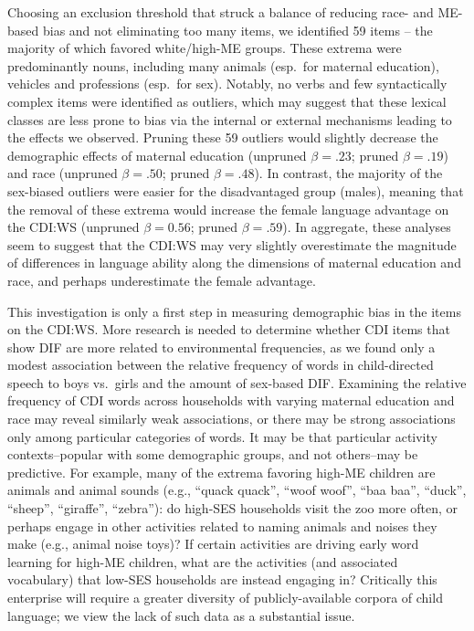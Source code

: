 \documentclass[10pt, letterpaper]{article}
\begin{document}
Choosing an exclusion threshold that struck a balance of reducing race-
and ME-based bias and not eliminating too many items, we identified 59
items -- the majority of which favored white/high-ME groups. These
extrema were predominantly nouns, including many animals (esp.~for
maternal education), vehicles and professions (esp.~for sex). Notably,
no verbs and few syntactically complex items were identified as
outliers, which may suggest that these lexical classes are less prone to
bias via the internal or external mechanisms leading to the effects we
observed. Pruning these 59 outliers would slightly decrease the
demographic effects of maternal education (unpruned \(\beta=.23\);
pruned \(\beta=.19\)) and race (unpruned \(\beta=.50\); pruned
\(\beta=.48\)). In contrast, the majority of the sex-biased outliers
were easier for the disadvantaged group (males), meaning that the
removal of these extrema would increase the female language advantage on
the CDI:WS (unpruned \(\beta=0.56\); pruned \(\beta=.59\)). In
aggregate, these analyses seem to suggest that the CDI:WS may very
slightly overestimate the magnitude of differences in language ability
along the dimensions of maternal education and race, and perhaps
underestimate the female advantage.

This investigation is only a first step in measuring demographic bias in
the items on the CDI:WS. More research is needed to determine whether
CDI items that show DIF are more related to environmental frequencies,
as we found only a modest association between the relative frequency of
words in child-directed speech to boys vs.~girls and the amount of
sex-based DIF. Examining the relative frequency of CDI words across
households with varying maternal education and race may reveal similarly
weak associations, or there may be strong associations only among
particular categories of words. It may be that particular activity
contexts--popular with some demographic groups, and not others--may be
predictive. For example, many of the extrema favoring high-ME children
are animals and animal sounds (e.g., ``quack quack'', ``woof woof'',
``baa baa'', ``duck'', ``sheep'', ``giraffe'', ``zebra''): do high-SES
households visit the zoo more often, or perhaps engage in other
activities related to naming animals and noises they make (e.g., animal
noise toys)? If certain activities are driving early word learning for
high-ME children, what are the activities (and associated vocabulary)
that low-SES households are instead engaging in? Critically this
enterprise will require a greater diversity of publicly-available
corpora of child language; we view the lack of such data as a
substantial issue.
\end{document}
